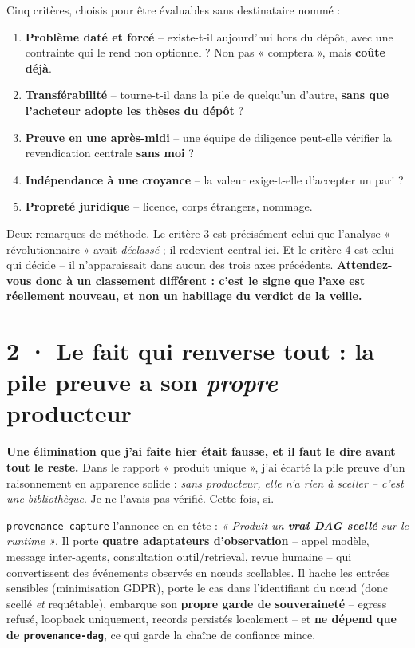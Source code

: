 \documentclass[10pt]{article}
\newcommand{\code}[1]{\texttt{\small #1}}
\begin{document}
Cinq critères, choisis pour être évaluables sans destinataire nommé :

\begin{enumerate}[leftmargin=1.5em,itemsep=1.5pt,topsep=2pt]
\item \textbf{Problème daté et forcé} -- existe-t-il aujourd'hui hors du dépôt, avec une contrainte qui
      le rend non optionnel ? Non pas « comptera », mais \textbf{coûte déjà}.
\item \textbf{Transférabilité} -- tourne-t-il dans la pile de quelqu'un d'autre, \textbf{sans que
      l'acheteur adopte les thèses du dépôt} ?
\item \textbf{Preuve en une après-midi} -- une équipe de diligence peut-elle vérifier la revendication
      centrale \textbf{sans moi} ?
\item \textbf{Indépendance à une croyance} -- la valeur exige-t-elle d'accepter un pari ?
\item \textbf{Propreté juridique} -- licence, corps étrangers, nommage.
\end{enumerate}

Deux remarques de méthode. Le critère 3 est précisément celui que l'analyse « révolutionnaire » avait
\emph{déclassé} ; il redevient central ici. Et le critère 4 est celui qui décide -- il n'apparaissait
dans aucun des trois axes précédents. \textbf{Attendez-vous donc à un classement différent : c'est le
signe que l'axe est réellement nouveau, et non un habillage du verdict de la veille.}

\section{2 · Le fait qui renverse tout : la pile preuve a son \emph{propre} producteur}

\begin{alerte}
\textbf{Une élimination que j'ai faite hier était fausse, et il faut le dire avant tout le reste.} Dans
le rapport « produit unique », j'ai écarté la pile preuve d'un raisonnement en apparence solide :
\emph{sans producteur, elle n'a rien à sceller -- c'est une bibliothèque}. Je ne l'avais pas vérifié.
Cette fois, si.
\end{alerte}

\code{provenance-capture} l'annonce en en-tête : \emph{« Produit un \textbf{vrai DAG scellé} sur le
runtime »}. Il porte \textbf{quatre adaptateurs d'observation} -- appel modèle, message inter-agents,
consultation outil/retrieval, revue humaine -- qui convertissent des événements observés en nœuds
scellables. Il hache les entrées sensibles (minimisation GDPR), porte le cas dans l'identifiant du
nœud (donc scellé \emph{et} requêtable), embarque son \textbf{propre garde de souveraineté} -- egress
refusé, loopback uniquement, records persistés localement -- et \textbf{ne dépend que de
\code{provenance-dag}}, ce qui garde la chaîne de confiance mince.
\end{document}
